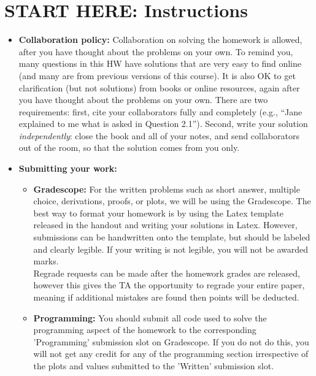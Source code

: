 \documentclass[12pt]{article}
\newcommand{\blackcircle}{\tikz\draw[black,fill=black] (0,0) circle (1ex);}
\begin{document}
\section*{START HERE: Instructions}
\begin{itemize}
\item \textbf{Collaboration policy:} Collaboration on solving the homework is allowed, after you have thought about the problems on your own. To remind you, many questions in this HW have solutions that are very easy to find online (and many are from previous versions of this course). It is also OK to get clarification (but not solutions) from books or online resources, again after you have thought about the problems on your own. There are two requirements: first, cite your collaborators fully and completely (e.g., ``Jane explained to me what is asked in Question 2.1''). Second, write your solution {\em independently}: close the book and all of your notes, and send collaborators out of the room, so that the solution comes from you only.  

\item\textbf{Submitting your work:} 

\begin{itemize}

\item \textbf{Gradescope:} For the written problems such as short answer, multiple choice, derivations, proofs, or plots, we will be using the Gradescope.  The best way to format your homework is by using the Latex template released in the handout and writing your solutions in Latex. However, submissions can be handwritten onto the template, but should be labeled and clearly legible. If your writing is not legible, you will not be awarded marks. \\
Regrade requests can be made after the homework grades are released, however this gives the TA the opportunity to regrade your entire paper, meaning if additional mistakes are found then points will be deducted. 

\item \textbf{Programming: }You should submit all code used to solve the programming aspect of the homework to the corresponding 'Programming' submission slot on Gradescope. If you do not do this, you will not get any credit for any of the programming section irrespective of the plots and values submitted to the 'Written' submission slot.
\end{itemize}

\end{itemize}


\clearpage

%
\newpage

\end{document}

